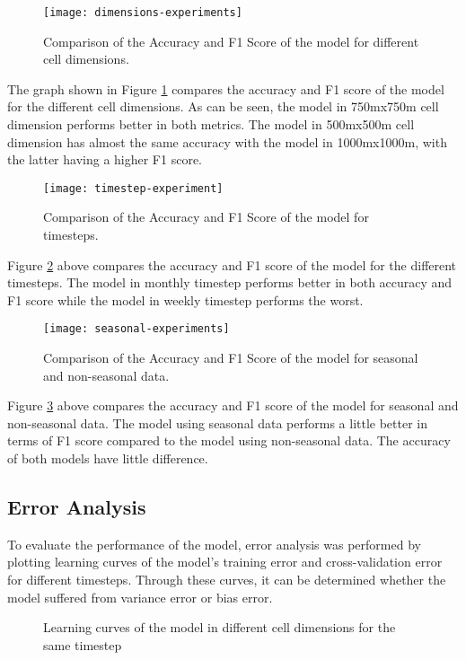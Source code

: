     \begin{figure}[H]
    \centering
    \texttt{[image: dimensions-experiments]}
    \caption{Comparison of the Accuracy and F1 Score of the model for different cell dimensions.}
    \label{fig:dimension-experiments}
    \end{figure}
    The graph shown in Figure \ref{fig:dimension-experiments} compares the accuracy and F1 score of the model for the different cell dimensions. As can be seen, the model in 750mx750m cell dimension performs better in both metrics. The model in 500mx500m cell dimension has almost the same accuracy with the model in 1000mx1000m, with the latter having a higher F1 score.

    \begin{figure}[H]
    \centering
    \texttt{[image: timestep-experiment]}
    \caption{Comparison of the Accuracy and F1 Score of the model for timesteps.}
    \label{fig:timestep-experiments}
    \end{figure}
    Figure \ref{fig:timestep-experiments} above compares the accuracy and F1 score of the model for the different timesteps. The model in monthly timestep performs better in both accuracy and F1 score while the model in weekly timestep performs the worst.
    
    \begin{figure}[H]
    \centering
    \texttt{[image: seasonal-experiments]}
    \caption{Comparison of the Accuracy and F1 Score of the model for seasonal and non-seasonal data.}
    \label{fig:seasonal-experiments}
    \end{figure}
    Figure \ref{fig:seasonal-experiments} above compares the accuracy and F1 score of the model for seasonal and non-seasonal data. The model using seasonal data performs a little better in terms of F1 score compared to the model using non-seasonal data. The accuracy of both models have little difference.

\subsection{Error Analysis}
    To evaluate the performance of the model, error analysis was performed by plotting learning curves of the model's training error and cross-validation error for different timesteps. Through these curves, it can be determined whether the model suffered from variance error or bias error.

    \begin{figure}[H]
    \centering
    \caption{Learning curves of the model in different cell dimensions for the same timestep}
    \label{fig:dimension-learning-curve}
    \end{figure}

